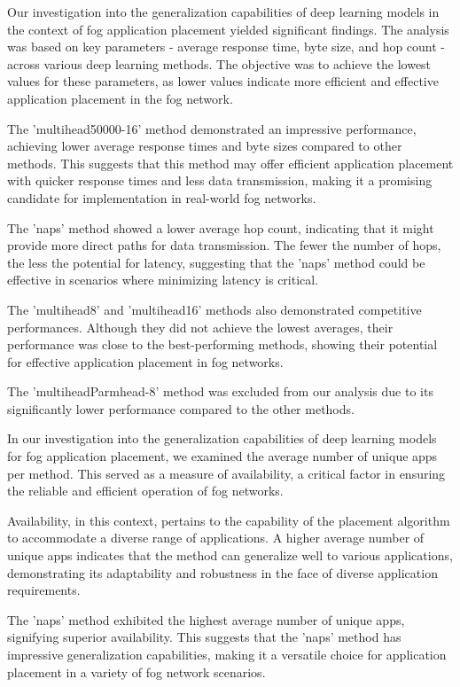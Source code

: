 \documentclass[conference]{IEEEtran}
\begin{document}
Our investigation into the generalization capabilities of deep learning models in the context of fog application placement yielded significant findings. The analysis was based on key parameters - average response time, byte size, and hop count - across various deep learning methods. The objective was to achieve the lowest values for these parameters, as lower values indicate more efficient and effective application placement in the fog network.

The 'multihead50000-16' method demonstrated an impressive performance, achieving lower average response times and byte sizes compared to other methods. This suggests that this method may offer efficient application placement with quicker response times and less data transmission, making it a promising candidate for implementation in real-world fog networks.

The 'naps' method showed a lower average hop count, indicating that it might provide more direct paths for data transmission. The fewer the number of hops, the less the potential for latency, suggesting that the 'naps' method could be effective in scenarios where minimizing latency is critical.

The 'multihead8' and 'multihead16' methods also demonstrated competitive performances. Although they did not achieve the lowest averages, their performance was close to the best-performing methods, showing their potential for effective application placement in fog networks.

The 'multiheadParmhead-8' method was excluded from our analysis due to its significantly lower performance compared to the other methods.

In our investigation into the generalization capabilities of deep learning models for fog application placement, we examined the average number of unique apps per method. This served as a measure of availability, a critical factor in ensuring the reliable and efficient operation of fog networks.

Availability, in this context, pertains to the capability of the placement algorithm to accommodate a diverse range of applications. A higher average number of unique apps indicates that the method can generalize well to various applications, demonstrating its adaptability and robustness in the face of diverse application requirements.

The 'naps' method exhibited the highest average number of unique apps, signifying superior availability. This suggests that the 'naps' method has impressive generalization capabilities, making it a versatile choice for application placement in a variety of fog network scenarios.
\end{document}
